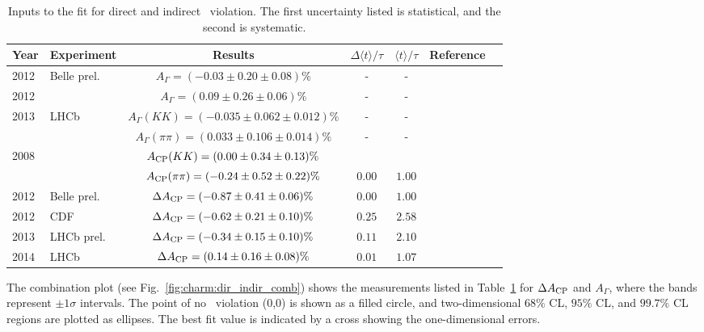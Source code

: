 \begin{table}
\centering 
\caption{Inputs to the fit for direct and indirect \cp\ violation. 
The first uncertainty listed is statistical, and the second is systematic.}
\label{tab:charm:dir_indir_comb}
\vspace{3pt}
\begin{tabular}{ll|ccccc}
\hline \hline
Year & 	Experiment	& Results
& $\Delta \langle t\rangle/\tau$ & $\langle t\rangle/\tau$ & Reference\\
\hline
2012	& Belle	prel. & $A_\Gamma = (-0.03 \pm 0.20 \pm 0.08 )\%$ &	-&	-&	 
\cite{Staric:2012ta}\\
2012	& \babar	& $A_\Gamma = (0.09 \pm 0.26 \pm 0.06 )\%$ &	-&	-&	 
\cite{Lees:2012qh}\\
2013	& LHCb	& $A_\Gamma(KK) = (-0.035 \pm 0.062 \pm 0.012 )\%$ &	-&	-&	 
\cite{Aaij:2013ria}\\
    	&     	& $A_\Gamma(\pi\pi) = (0.033 \pm 0.106 \pm 0.014 )\%$ &	-&	-&	 
                   \\
2008	& \babar	& $A_{\rm CP}(KK) = (0.00 \pm 0.34 \pm 0.13 )\%$&&&\\ 
& & $A_{\rm CP}(\pi\pi) = (-0.24 \pm 0.52 \pm 0.22 )\%$ &	$0.00$ &	
$1.00$ &	 \cite{Aubert:2007if}\\
2012	& Belle	prel. & $\Delta A_{\rm CP} = (-0.87 \pm 0.41 \pm 0.06 )\%$ &	
$0.00$ &	$1.00$ &	 \cite{Ko:2012px}\\
2012	& CDF	 & $\Delta A_{\rm CP} = (-0.62 \pm 0.21 \pm 0.10 )\%$ &	
$0.25$ &	$2.58$ &	 \cite{Collaboration:2012qw}\\
2013	& LHCb	prel. & $\Delta A_{\rm CP} = (-0.34 \pm 0.15 \pm 0.10 )\%$ &	
$0.11$ &	$2.10$ &	 \cite{LHCb:2013dka}\\
2014	& LHCb	& $\Delta A_{\rm CP} = (0.14 \pm 0.16 \pm 0.08 )\%$ &	
$0.01$ &	$1.07$ &	 \cite{Aaij:2014gsa}\\
\hline
\end{tabular}
\end{table}

The combination plot (see Fig.~\ref{fig:charm:dir_indir_comb}) shows the measurements listed in 
Table~\ref{tab:charm:dir_indir_comb} for
$\Delta A_{\rm CP}$ and $A_\Gamma$, where the bands represent $\pm1\sigma$ 
intervals.  The point of no \cp\ violation (0,0) is shown as a filled circle, 
and two-dimensional $68\%$ CL, $95\%$ CL, and $99.7\%$ CL regions are plotted 
as ellipses. The best fit value is indicated by a cross showing the
one-dimensional errors.

